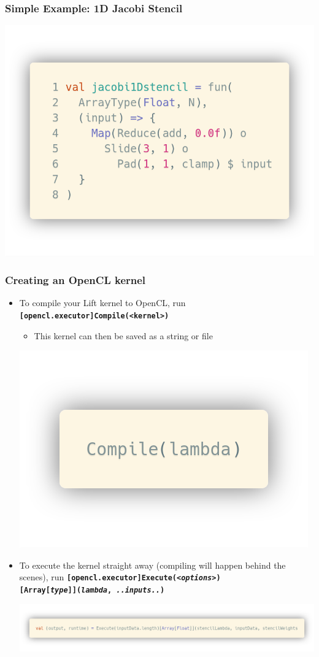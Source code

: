 \documentclass[10pt,usetotalslideindicator]{beamer}
\newcommand{\code}[1]{\textbf{\texttt{#1}}}
\begin{document}
\begin{frame}
\frametitle{Simple Example: 1D Jacobi Stencil}
\begin{block}{}
    \begin{center}
    \includegraphics[width=.5\textwidth]{../images/jacobi1Dstencil.png}
    \end{center}
\end{block}
\end{frame}

\begin{frame}
\frametitle{Creating an OpenCL kernel}
\begin{itemize}
    \item To compile your Lift kernel to OpenCL, run \code{[opencl.executor]Compile(<kernel>)}
        \begin{itemize}
                \item This kernel can then be saved as a string or file
        \end{itemize}
        \vspace{-.7cm}
        \begin{block}{}
        \begin{center}
            \includegraphics[width=.2\textwidth]{../images/simpleCompile.png}
        \end{center}
        \end{block}
    \item To execute the kernel straight away (compiling will happen behind the scenes), run \code{[opencl.executor]Execute(\textit{<options>})     \\
        \hspace{0.5cm}[Array[\textit{type}]](\textit{lambda}, \textit{..inputs..})}
    \begin{block}{}
        \begin{center}
            \includegraphics[width=\textwidth]{../images/execute.png}
        \end{center}
    \end{block}
\end{itemize}
\end{frame}
\end{document}
